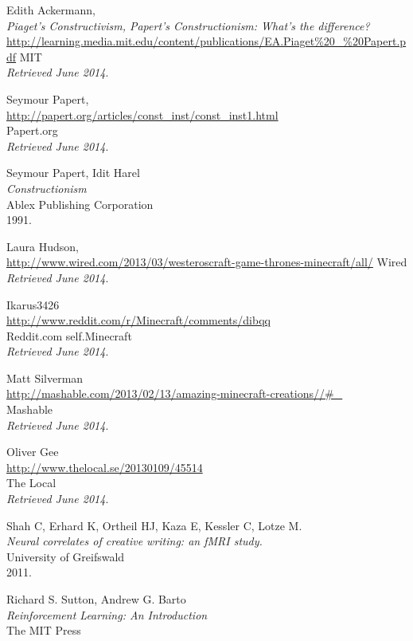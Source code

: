 \begin{thebibliography}{99}
  Edith Ackermann, \\
  \emph{Piaget’s Constructivism, Papert’s Constructionism: 
What’s the difference?} \\
  \url{http://learning.media.mit.edu/content/publications/EA.Piaget%20_%20Papert.pdf}
  MIT \\
  \emph{Retrieved June 2014}.

  Seymour Papert, \\
  \url{http://papert.org/articles/const_inst/const_inst1.html} \\
  Papert.org \\
  \emph{Retrieved June 2014}.

  Seymour Papert, Idit Harel \\
  \emph{Constructionism} \\
  Ablex Publishing Corporation \\
  1991.

  Laura Hudson, \\
  \url{http://www.wired.com/2013/03/westeroscraft-game-thrones-minecraft/all/}
  Wired \\
  \emph{Retrieved June 2014}.

  Ikarus3426 \\
  \url{http://www.reddit.com/r/Minecraft/comments/dibqq} \\
  Reddit.com self.Minecraft \\
  \emph{Retrieved June 2014}.  

  Matt Silverman \\
  \url{http://mashable.com/2013/02/13/amazing-minecraft-creations//#_} \\
  Mashable \\
  \emph{Retrieved June 2014}.

  Oliver Gee \\
  \url{http://www.thelocal.se/20130109/45514} \\
  The Local \\
  \emph{Retrieved June 2014}.

  Shah C, Erhard K, Ortheil HJ, Kaza E, Kessler C, Lotze M. \\
  \emph{Neural correlates of creative writing: an fMRI study.} \\
  University of Greifswald \\
  2011.

  Richard S. Sutton, Andrew G. Barto \\
  \emph{Reinforcement Learning: An Introduction } \\
  The MIT Press \\


\end{thebibliography}
